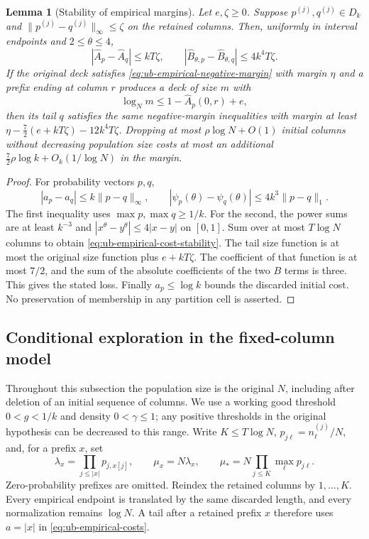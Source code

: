 \documentclass[11pt]{article}
\numberwithin{equation}{section}
\newtheorem{lemma}[lemma]{Lemma}
\newcommand{\1}{\mathbf 1}
\begin{document}
\begin{lemma}[Stability of empirical margins]
\label{lem:ub-conditional-preservation}
Let $e,\zeta\ge0$. Suppose $p^{(j)},q^{(j)}\in D_k$ and
$\|p^{(j)}-q^{(j)}\|_\infty\le\zeta$ on the retained columns.
Then, uniformly in interval endpoints and $2\le\theta\le4$,
\begin{equation}
\label{eq:ub-empirical-cost-stability}
 |\widehat A_p-\widehat A_q|\le kT\zeta,\qquad
 |\widehat B_{\theta,p}-\widehat B_{\theta,q}|\le4k^4T\zeta.
\end{equation}
If the original deck satisfies
\eqref{eq:ub-empirical-negative-margin} with margin $\eta$ and a
prefix ending at column $r$ produces a deck of size $m$ with
\[
 \log_Nm\le1-\widehat A_p(0,r)+e,
\]
then its tail $q$ satisfies the same negative-margin inequalities with
margin at least $\eta-\frac72(e+kT\zeta)-12k^4T\zeta$.
Dropping at most $\rho\log N+O(1)$ initial columns without decreasing
population size costs at most an additional
$\frac72\rho\log k+O_k(1/\log N)$ in the margin.
\end{lemma}

\begin{proof}
For probability vectors $p,q$,
\[
 |a_p-a_q|\le k\|p-q\|_\infty,\qquad
 |\psi_p(\theta)-\psi_q(\theta)|\le4k^3\|p-q\|_1.
\]
The first inequality uses $\max p,\max q\ge1/k$.
For the second, the power sums are at least $k^{-3}$ and
$|x^\theta-y^\theta|\le4|x-y|$ on $[0,1]$.
Sum over at most $T\log N$ columns to obtain
\eqref{eq:ub-empirical-cost-stability}. The tail size function is at
most the original size function plus $e+kT\zeta$.
The coefficient of that function is at most $7/2$, and the sum of the
absolute coefficients of the two $B$ terms is three. This gives the
stated loss. Finally $a_p\le\log k$ bounds the discarded initial cost.
No preservation of membership in any partition cell is asserted.
\end{proof}


\subsection{Conditional exploration in the fixed-column model}

Throughout this subsection the population size is the original \(N\),
including after deletion of an initial sequence of columns. We use
a working good threshold $0<g<1/k$ and density $0<\gamma\le1$;
any positive thresholds in the original hypothesis can be decreased
to this range. Write
\(K\le T\log N\), \(p_{j\ell}=n^{(j)}_\ell/N\), and, for a prefix
\(x\), set
\[
 \lambda_x=\prod_{j\le |x|}p_{j,x[j]},\qquad
 \mu_x=N\lambda_x,\qquad
 \mu_*=N\prod_{j\le K}\max_\ell p_{j\ell}.
\]
Zero-probability prefixes are omitted.  Reindex the retained columns by $1,\ldots,K$. Every empirical
endpoint is translated by the same discarded length, and every
normalization remains $\log N$. A tail after a retained prefix $x$
therefore uses $a=|x|$ in \eqref{eq:ub-empirical-costs}.
\end{document}
